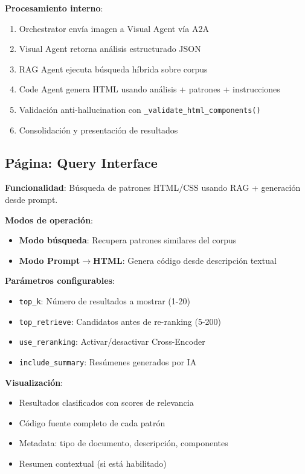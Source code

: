 \documentclass[12pt,a4paper]{article}
\begin{document}
\textbf{Procesamiento interno}:
\begin{enumerate}
    \item Orchestrator envía imagen a Visual Agent vía A2A
    \item Visual Agent retorna análisis estructurado JSON
    \item RAG Agent ejecuta búsqueda híbrida sobre corpus
    \item Code Agent genera HTML usando análisis + patrones + instrucciones
    \item Validación anti-hallucination con \texttt{\_validate\_html\_components()}
    \item Consolidación y presentación de resultados
\end{enumerate}

\subsection{Página: Query Interface}

\textbf{Funcionalidad}: Búsqueda de patrones HTML/CSS usando RAG + generación desde prompt.

\textbf{Modos de operación}:
\begin{itemize}
    \item \textbf{Modo búsqueda}: Recupera patrones similares del corpus
    \item \textbf{Modo Prompt$\rightarrow$HTML}: Genera código desde descripción textual
\end{itemize}

\textbf{Parámetros configurables}:
\begin{itemize}
    \item \texttt{top\_k}: Número de resultados a mostrar (1-20)
    \item \texttt{top\_retrieve}: Candidatos antes de re-ranking (5-200)
    \item \texttt{use\_reranking}: Activar/desactivar Cross-Encoder
    \item \texttt{include\_summary}: Resúmenes generados por IA
\end{itemize}

\textbf{Visualización}:
\begin{itemize}
    \item Resultados clasificados con scores de relevancia
    \item Código fuente completo de cada patrón
    \item Metadata: tipo de documento, descripción, componentes
    \item Resumen contextual (si está habilitado)
\end{itemize}
\end{document}
